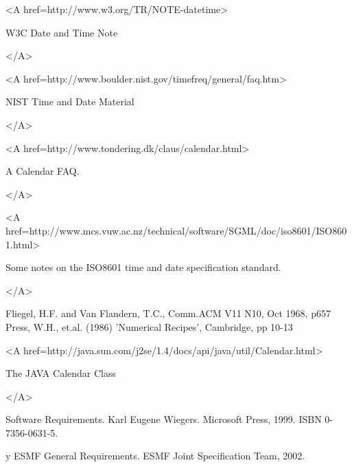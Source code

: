 \begin{thebibliography}{99}
\begin{rawhtml}<A href=http://www.w3.org/TR/NOTE-datetime>\end{rawhtml}
W3C Date and Time Note
\begin{rawhtml}</A>\end{rawhtml}

\begin{rawhtml}<A href=http://www.boulder.nist.gov/timefreq/general/faq.htm>\end{rawhtml}
NIST Time and Date Material
\begin{rawhtml}</A>\end{rawhtml}

\begin{rawhtml}<A href=http://www.tondering.dk/claus/calendar.html>\end{rawhtml}
A Calendar FAQ.
\begin{rawhtml}</A>\end{rawhtml}

\begin{rawhtml}<A href=http://www.mcs.vuw.ac.nz/technical/software/SGML/doc/iso8601/ISO8601.html>\end{rawhtml}
Some notes on the ISO8601 time and date specification standard.
\begin{rawhtml}</A>\end{rawhtml}

Fliegel, H.F. and Van Flandern, T.C., Comm.ACM V11 N10, Oct 1968, p657
Press, W.H., et.al. (1986) 'Numerical Recipes', Cambridge, pp 10-13

\begin{rawhtml}<A href=http://java.sun.com/j2se/1.4/docs/api/java/util/Calendar.html>
\end{rawhtml}
The JAVA Calendar Class
\begin{rawhtml}</A>\end{rawhtml}

Software Requirements. Karl Eugene Wiegers. Microsoft Press, 1999. ISBN 0-7356-0631-5.

y
ESMF General Requirements.  ESMF Joint Specification Team, 2002.

\end{thebibliography}

%





























